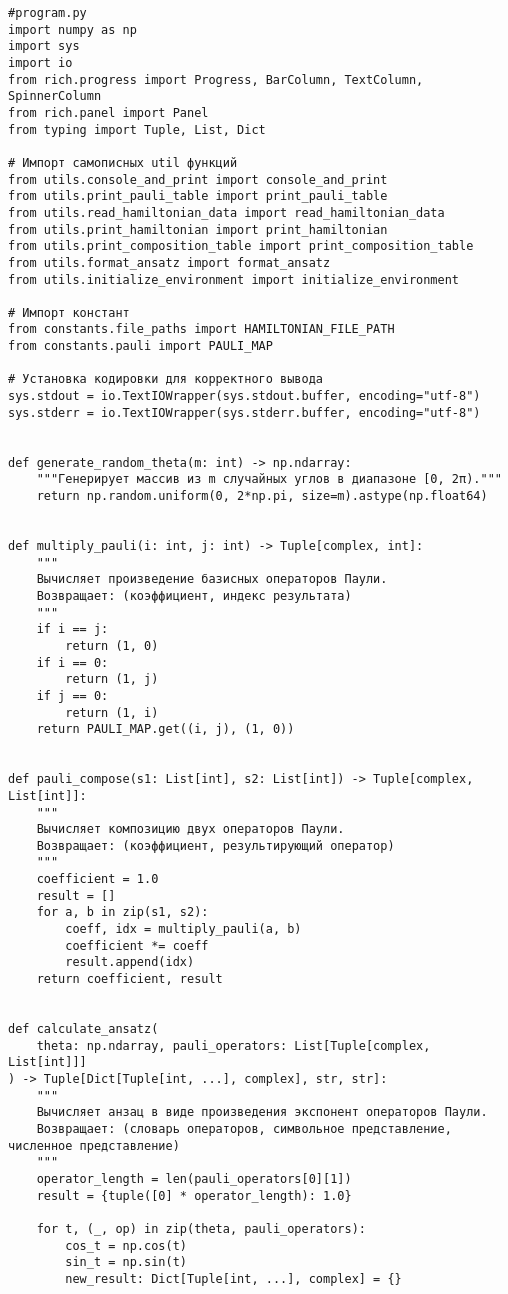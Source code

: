 \documentclass[a4paper]{report}
\begin{document}
\begin{lstlisting}
#program.py
import numpy as np
import sys
import io
from rich.progress import Progress, BarColumn, TextColumn, SpinnerColumn
from rich.panel import Panel
from typing import Tuple, List, Dict

# Импорт самописных util функций
from utils.console_and_print import console_and_print
from utils.print_pauli_table import print_pauli_table
from utils.read_hamiltonian_data import read_hamiltonian_data
from utils.print_hamiltonian import print_hamiltonian
from utils.print_composition_table import print_composition_table
from utils.format_ansatz import format_ansatz
from utils.initialize_environment import initialize_environment

# Импорт констант
from constants.file_paths import HAMILTONIAN_FILE_PATH
from constants.pauli import PAULI_MAP

# Установка кодировки для корректного вывода
sys.stdout = io.TextIOWrapper(sys.stdout.buffer, encoding="utf-8")
sys.stderr = io.TextIOWrapper(sys.stderr.buffer, encoding="utf-8")


def generate_random_theta(m: int) -> np.ndarray:
    """Генерирует массив из m случайных углов в диапазоне [0, 2π)."""
    return np.random.uniform(0, 2*np.pi, size=m).astype(np.float64)


def multiply_pauli(i: int, j: int) -> Tuple[complex, int]:
    """
    Вычисляет произведение базисных операторов Паули.
    Возвращает: (коэффициент, индекс результата)
    """
    if i == j:
        return (1, 0)
    if i == 0:
        return (1, j)
    if j == 0:
        return (1, i)
    return PAULI_MAP.get((i, j), (1, 0))


def pauli_compose(s1: List[int], s2: List[int]) -> Tuple[complex, List[int]]:
    """
    Вычисляет композицию двух операторов Паули.
    Возвращает: (коэффициент, результирующий оператор)
    """
    coefficient = 1.0
    result = []
    for a, b in zip(s1, s2):
        coeff, idx = multiply_pauli(a, b)
        coefficient *= coeff
        result.append(idx)
    return coefficient, result


def calculate_ansatz(
    theta: np.ndarray, pauli_operators: List[Tuple[complex, List[int]]]
) -> Tuple[Dict[Tuple[int, ...], complex], str, str]:
    """
    Вычисляет анзац в виде произведения экспонент операторов Паули.
    Возвращает: (словарь операторов, символьное представление, численное представление)
    """
    operator_length = len(pauli_operators[0][1])
    result = {tuple([0] * operator_length): 1.0}

    for t, (_, op) in zip(theta, pauli_operators):
        cos_t = np.cos(t)
        sin_t = np.sin(t)
        new_result: Dict[Tuple[int, ...], complex] = {}


\end{lstlisting}
\end{document}
